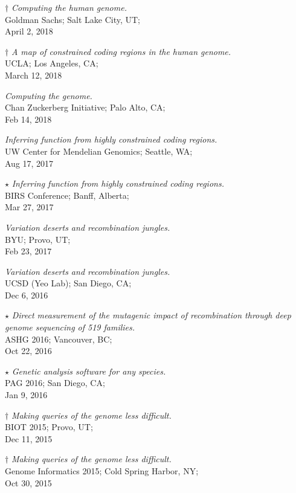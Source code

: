 \documentclass[margin,line]{cv}
\begin{document}
\begin{resume}
    $\dagger$ \textit{Computing the human genome.
} \\
    Goldman Sachs; Salt Lake City, UT; \\
    April 2, 2018

    $\dagger$ \textit{A map of constrained coding regions in the human genome.
} \\
    UCLA; Los Angeles, CA; \\
    March 12, 2018

    \textit{Computing the genome.} \\
    Chan Zuckerberg Initiative; Palo Alto, CA; \\
    Feb 14, 2018

    \textit{Inferring function from highly constrained coding regions.} \\
    UW Center for Mendelian Genomics; Seattle, WA; \\
    Aug 17, 2017

    $\star$ \textit{Inferring function from highly constrained coding regions.} \\
    BIRS Conference; Banff, Alberta; \\
    Mar 27, 2017

    \textit{Variation deserts and recombination jungles.} \\
    BYU; Provo, UT; \\
    Feb 23, 2017

    \textit{Variation deserts and recombination jungles.} \\
    UCSD (Yeo Lab); San Diego, CA; \\
    Dec 6, 2016

    $\star$ \textit{Direct measurement of the mutagenic impact of recombination through deep genome sequencing of 519 families.} \\
    ASHG 2016; Vancouver, BC; \\
    Oct 22, 2016

    $\star$ \textit{Genetic analysis software for any species.} \\
    PAG 2016; San Diego, CA; \\
    Jan 9, 2016

    $\dagger$ \textit{Making queries of the genome less difficult.} \\
    BIOT 2015; Provo, UT; \\
    Dec 11, 2015

    $\dagger$ \textit{Making queries of the genome less difficult.} \\
    Genome Informatics 2015; Cold Spring Harbor, NY; \\
    Oct 30, 2015


\end{resume}
\end{document}

